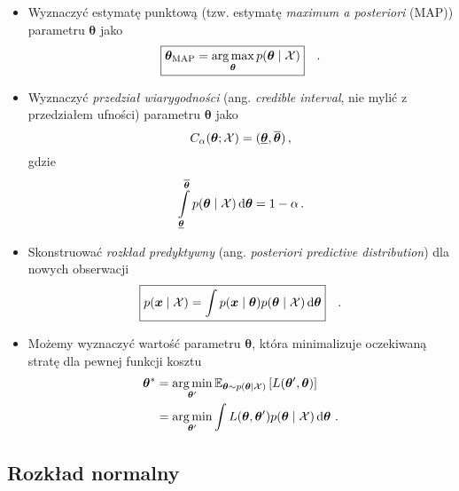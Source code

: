 \documentclass{myclass}
\begin{document}
\begin{itemize}
    \item Wyznaczyć estymatę punktową (tzw. estymatę \emph{maximum a posteriori} (MAP)) parametru
    \(\bm{\theta}\) jako
    \[
    \boxed{
        \bm{\theta}_\text{MAP} = \operatorname*{arg\,max}_{\bm{\theta}} p(\bm{\theta} \mid \mathcal{X})
    }\quad.
    \]

    \item Wyznaczyć \emph{przedział wiarygodności} (ang. \emph{credible interval}, nie mylić z
    przedziałem ufności) parametru \(\bm{\theta}\) jako
    \[
        C_\alpha (\bm{\theta}; \mathcal{X}) = (\underline{\bm{\theta}}, \overline{\bm{\theta}})\,,
    \]
    gdzie
    \[
        \int\limits_{\underline{\bm{\theta}}}^{\overline{\bm{\theta}}} p(\bm{\theta} \mid \mathcal{X}) \dd{\bm{\theta}} = 1 - \alpha\,.
    \]

    \item Skonstruować \emph{rozkład predyktywny} (ang. \emph{posteriori predictive distribution})
    dla nowych obserwacji
    \[
    \boxed{
        p(\bm{x} \mid \mathcal{X}) = \int p(\bm{x} \mid \bm{\theta}) p(\bm{\theta} \mid \mathcal{X}) \dd{\bm{\theta}}
    }\quad.
    \]

    \item Możemy wyznaczyć wartość parametru \(\bm{\theta}\), która minimalizuje oczekiwaną stratę
    dla pewnej funkcji kosztu
    \[\begin{split} \bm{\theta}^* &= \operatorname*{arg\,min}_{\bm{\theta}'} \mathbb{E}_{\bm{\theta} \sim
        p(\bm{\theta}\mid\mathcal{X})}\left[ L(\bm{\theta}', \bm{\theta}) \right] \\
                      &= \operatorname*{arg\,min}_{\bm{\theta}'} \int L(\bm{\theta}, \bm{\theta}') p(\bm{\theta} \mid
                      \mathcal{X}) \dd{\bm{\theta}}\,.
    \end{split}
    \]

\end{itemize}

\subsection{Rozkład normalny}
\end{document}
